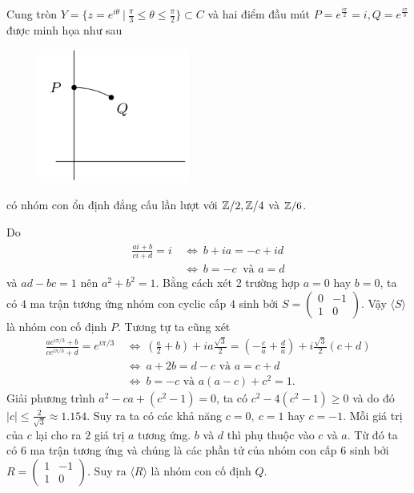 \begin{proposition}
    Cung tròn $Y = \{z = e^{i \theta}\ |\ \frac{\pi}{3} \leq \theta \leq \frac{\pi}{2} \} \subset C$ và hai điểm đầu mút $P = e^{\frac{i\pi}{2}} =  i, Q = e^{\frac{i\pi}{3}}$ được minh họa như sau

    \begin{figure}[H]
        \includegraphics[width=5cm]{assets/circle-segment.png}
        \centering
    \end{figure}
    có nhóm con ổn định đẳng cấu lần lượt với $\mathbb Z/2, \mathbb Z/4$ và $\mathbb Z/6$.
\end{proposition}

\startproof
Do
$$
    \begin{aligned}
        \frac{ai+b}{ci+d} =i & \ \Leftrightarrow\ b+ia=-c+id             \\
                             & \ \Leftrightarrow\  b=-c\ \text{ và } a=d
    \end{aligned}
$$
và $ad - bc = 1$ nên $a^2 + b^2 = 1$. Bằng cách xét 2 trường hợp $a = 0$ hay $b = 0$, ta có $4$ ma trận tương ứng nhóm con cyclic cấp $4$ sinh bởi $S =\begin{pmatrix}
        0 & -1 \\
        1 & 0
    \end{pmatrix}$. Vậy $\langle S \rangle$ là nhóm con cố định $P$. Tương tự ta cũng xét
$$
    \begin{aligned}
        \frac{ae^{i\pi /3} +b}{ce^{i\pi /3} +d} =e^{i\pi /3} & \ \Leftrightarrow\ \left(\frac{a}{2} +b\right) +ia\frac{\sqrt{3}}{2} =\left( -\frac{c}{a} +\frac{d}{a}\right) +i\frac{\sqrt{3}}{2}( c+d) \\
                                                             & \ \Leftrightarrow\ a+2b=d-c\text{ và } a=c+d                                                                                             \\
                                                             & \ \Leftrightarrow\ b=-c\text{ và } a( a-c) +c^{2} =1.
    \end{aligned}
$$
Giải phương trình $a^2-ca+(c^2-1)=0$, ta có $c^2 - 4(c^2-1) \geq 0$ và do đó $|c| \leq \frac{2}{\sqrt{3}} \approx 1.154$. Suy ra ta có các khả năng $c = 0,\ c=1$ hay $c=-1$. Mỗi giá trị của $c$ lại cho ra $2$ giá trị $a$ tương ứng. $b$ và $d$ thì phụ thuộc vào $c$ và $a$. Từ đó ta có $6$ ma trận tương ứng và chúng là các phần tử của nhóm con cấp $6$ sinh bởi $R = \begin{pmatrix}
        1 & -1 \\
        1 & 0
    \end{pmatrix}$. Suy ra $\langle R \rangle$ là nhóm con cố định $Q$.


